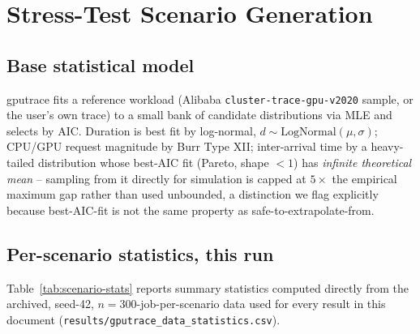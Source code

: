 \documentclass[11pt]{article}
\begin{document}
\section{Stress-Test Scenario Generation}
\label{sec:scenarios}

\subsection{Base statistical model}
gputrace fits a reference workload (Alibaba \texttt{cluster-trace-gpu-v2020}
sample, or the user's own trace) to a small bank of candidate distributions
via MLE and selects by AIC. Duration is best fit by log-normal,
$d \sim \mathrm{LogNormal}(\mu, \sigma)$; CPU/GPU request magnitude by
Burr Type XII; inter-arrival time by a heavy-tailed distribution whose
best-AIC fit (Pareto, shape $<1$) has \emph{infinite theoretical mean} --
sampling from it directly for simulation is capped at $5\times$ the
empirical maximum gap rather than used unbounded, a distinction we flag
explicitly because best-AIC-fit is not the same property as
safe-to-extrapolate-from.

\subsection{Per-scenario statistics, this run}
\label{sec:scenario-stats}
Table~\ref{tab:scenario-stats} reports summary statistics computed
directly from the archived, seed-42, $n=300$-job-per-scenario data used
for every result in this document (\texttt{results/gputrace\_data\_statistics.csv}).
\end{document}
